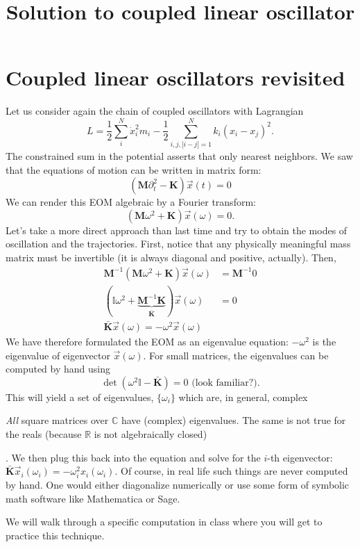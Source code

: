 \documentclass{article}
\title{Solution to coupled linear oscillator}
\theoremstyle{definition}
\theoremstyle{remark}
\theoremstyle{example}
\begin{document}
\maketitle

\section*{Coupled linear oscillators revisited}
Let us consider again the chain of coupled oscillators with Lagrangian
$$
L = \frac{1}{2}\sum_i^N \dot x_i^2 m_i - \frac{1}{2}\sum_{i,j, |i-j|=1}^N k_{i}(x_i-x_j)^2.
$$
The constrained sum in the potential asserts that only nearest neighbors. We saw that the equations of motion can be written in matrix form:
$$
(\mathbf M \partial_t^2-\mathbf K )\vec x(t) = 0
$$
We can render this EOM algebraic by a Fourier transform:
$$(\mathbf M \omega^2+\mathbf K )\vec x(\omega) = 0.
$$
Let's take a more direct approach than last time and try to obtain the modes of oscillation and the trajectories. First, notice that any physically meaningful mass matrix must be invertible (it is always diagonal and positive, actually). Then,
\begin{align*}
  \mathbf{M}^{-1}(\mathbf M \omega^2+\mathbf K) \vec x(\omega)&=\mathbf{M}^{-1}0 \\
  (\mathbb I \omega^2+\underbrace{\mathbf{M}^{-1}\mathbf K}_{\bar {\mathbf K}})\vec x(\omega)&=0\\
  \bar{\mathbf K}\vec x(\omega) = -\omega^2 \vec x(\omega)
\end{align*}
We have therefore formulated the EOM as an eigenvalue equation: $-\omega^2$ is the eigenvalue of eigenvector $\vec x(\omega)$. For small matrices, the eigenvalues can be computed by hand using
$$
\det(\omega^2\mathbb I - \bar{\mathbf K})=0 \text{ (look familiar?)}.
$$
This will yield a set of eigenvalues, $\{\omega_i\}$ which are, in general, complex \begin{footnote}{\emph{All} square matrices over $\mathbb C$ have (complex) eigenvalues. The same is not true for the reals (because $\mathbb R$ is not algebraically closed)}\end{footnote}. We then plug this back into the equation and solve for the $i$-th eigenvector: $\bar{\mathbf K }\vec x_i(\omega_i)=-\omega_i^2x_i(\omega_i)$. Of course, in real life such things are never computed by hand. One would either diagonalize numerically or use some form of symbolic math software like Mathematica or Sage. 

We will walk through a specific computation in class where you will get to practice this technique. 
\end{document}
